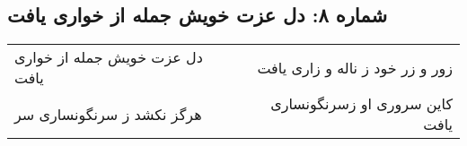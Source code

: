 \begin{center}
\section*{شماره ۸: دل عزت خویش جمله از خواری یافت}
\label{sec:008}
\begin{longtable}{l p{0.5cm} r}
دل عزت خویش جمله از خواری یافت
&&
زور و زر خود ز ناله و زاری یافت
\\
هرگز نکشد ز سرنگونساری سر
&&
کاین سروری او زسرنگونساری یافت
\\
\end{longtable}
\end{center}
